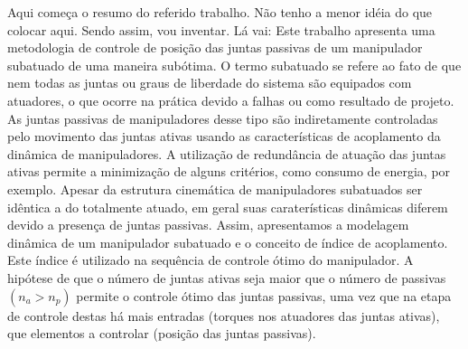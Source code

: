 Aqui começa o resumo do referido trabalho. Não tenho a menor idéia do que colocar aqui. Sendo assim, vou inventar. Lá vai: Este trabalho apresenta uma metodologia de controle de posição das juntas passivas de um manipulador subatuado de uma maneira subótima. O termo subatuado se refere ao fato de que nem todas as juntas ou graus de liberdade do sistema são equipados com atuadores, o que ocorre na prática devido a falhas ou como resultado de projeto. As juntas passivas de manipuladores desse tipo são indiretamente controladas pelo movimento das juntas ativas usando as características de acoplamento da dinâmica de manipuladores. A utilização de redundância de atuação das juntas ativas permite a minimização de alguns critérios, como consumo de energia, por exemplo.
Apesar da estrutura cinemática de manipuladores subatuados ser idêntica a do totalmente atuado, em geral suas caraterísticas dinâmicas diferem devido a presença de juntas passivas. Assim, apresentamos a modelagem dinâmica de um manipulador subatuado e o conceito de índice de acoplamento. Este índice é utilizado na sequência de controle ótimo do \mbox{manipulador}.
A hipótese de que o número de juntas ativas seja maior que o número de
passivas  $(n_{a} > n_{p})$  permite o controle ótimo das juntas passivas, uma vez que na etapa de controle destas há mais entradas (torques nos atuadores das juntas ativas), que elementos a controlar (posição das juntas passivas). 